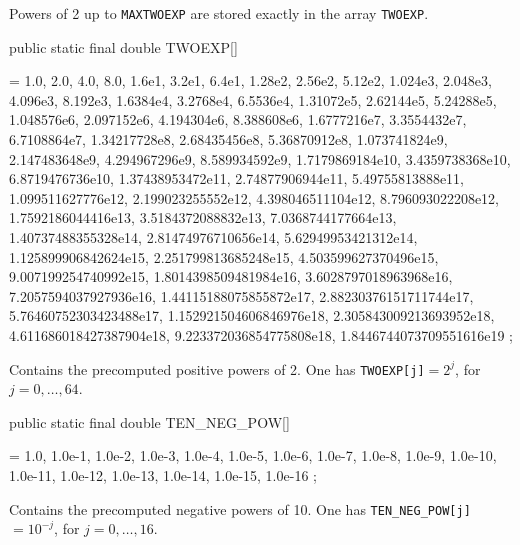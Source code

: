   \begin{tabb}   Powers of 2 up to \texttt{MAXTWOEXP} are stored exactly
    in the array \texttt{TWOEXP}.
  \end{tabb}
\begin{code}

   public static final double TWOEXP[]\begin{hide} = {
      1.0, 2.0, 4.0, 8.0, 1.6e1, 3.2e1,
      6.4e1, 1.28e2, 2.56e2, 5.12e2, 1.024e3,
      2.048e3, 4.096e3, 8.192e3, 1.6384e4, 3.2768e4,
      6.5536e4, 1.31072e5, 2.62144e5, 5.24288e5,
      1.048576e6, 2.097152e6, 4.194304e6, 8.388608e6,
      1.6777216e7, 3.3554432e7, 6.7108864e7,
      1.34217728e8, 2.68435456e8, 5.36870912e8,
      1.073741824e9, 2.147483648e9, 4.294967296e9,
      8.589934592e9, 1.7179869184e10, 3.4359738368e10,
      6.8719476736e10, 1.37438953472e11, 2.74877906944e11,
      5.49755813888e11, 1.099511627776e12, 2.199023255552e12,
      4.398046511104e12, 8.796093022208e12,
      1.7592186044416e13, 3.5184372088832e13,
      7.0368744177664e13, 1.40737488355328e14,
      2.81474976710656e14, 5.62949953421312e14,
      1.125899906842624e15, 2.251799813685248e15,
      4.503599627370496e15, 9.007199254740992e15,
      1.8014398509481984e16, 3.6028797018963968e16,
      7.2057594037927936e16, 1.44115188075855872e17,
      2.88230376151711744e17, 5.76460752303423488e17,
      1.152921504606846976e18, 2.305843009213693952e18,
      4.611686018427387904e18, 9.223372036854775808e18,
      1.8446744073709551616e19
     };
\end{hide}
\end{code}
 \begin{tabb} Contains the precomputed positive powers of 2.
   One has \texttt{TWOEXP[j]}$ = 2^j$, for $j=0,\dots,64$.
 \end{tabb}
\begin{code}

   public static final double TEN_NEG_POW[]\begin{hide} = {
      1.0, 1.0e-1, 1.0e-2, 1.0e-3, 1.0e-4, 1.0e-5, 1.0e-6, 1.0e-7, 1.0e-8,
      1.0e-9, 1.0e-10, 1.0e-11, 1.0e-12, 1.0e-13, 1.0e-14, 1.0e-15, 1.0e-16
     };
\end{hide}
\end{code}
 \begin{tabb} Contains the precomputed negative powers of 10.
   One has \texttt{TEN\_NEG\_POW[j]}$ = 10^{-j}$, for $j=0,\ldots,16$.
 \end{tabb}


